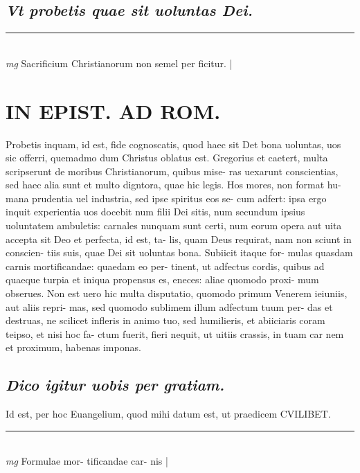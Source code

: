 \documentclass{article}
\begin{document}
\begin{pages}
\subsection*{\textit{Vt probetis quae sit uoluntas Dei. }}
\vspace{0.5cm}\noindent
\vspace{0.2cm}\rule{1cm}{0.2pt}\\ 
\hspace{0.2cm}\textit{mg}
\footnotesize Sacrificium Christianorum non semel per ficitur. 
\normalsize| 
\section*{IN EPIST. AD ROM.  }
\marginpar{[ p.142 ]}\pstart Probetis inquam, id est, fide cognoscatis, quod haec sit Det bona uoluntas, uos sic offerri, quemadmo dum Christus oblatus est. Gregorius et caetert, multa scripserunt de moribus Christianorum, quibus mise- ras uexarunt conscientias, sed haec alia sunt et multo digntora, quae hic legis. Hos mores, non format hu- mana prudentia uel industria, sed ipse spiritus eos se- cum adfert: ipsa ergo inquit experientia uos docebit num filii Dei sitis, num secundum ipsius uoluntatem ambuletis: carnales nunquam sunt certi, num eorum opera aut uita accepta sit Deo et perfecta, id est, ta- lis, quam Deus requirat, nam non sciunt in conscien- tiis suis, quae Dei sit uoluntas bona. Subiicit itaque for- mulas quasdam carnis mortificandae: quaedam eo per- tinent, ut adfectus cordis, quibus ad quaeque turpia et iniqua propensus es, eneces: aliae quomodo proxi- mum obserues. Non est uero hic multa disputatio, quomodo primum Venerem ieiuniis, aut aliis repri- mas, sed quomodo sublimem illum adfectum tuum per- das et destruas, ne scilicet infleris in animo tuo, sed humilieris, et abiiciaris coram teipso, et nisi hoc fa- ctum fuerit, fieri nequit, ut uitiis crassis, in tuam car nem et proximum, habenas imponas.  \pend
{}
{}
\subsection*{\textit{Dico igitur uobis per gratiam. }}\pstart Id est, per hoc Euangelium, quod mihi datum est, ut praedicem CVILIBET.  \pend
\vspace{0.5cm}\noindent
\vspace{0.2cm}\rule{1cm}{0.2pt}\\ 
\hspace{0.2cm}\textit{mg}
\footnotesize Formulae mor- tificandae car- nis 
\normalsize| 

\end{pages}
\end{document}
